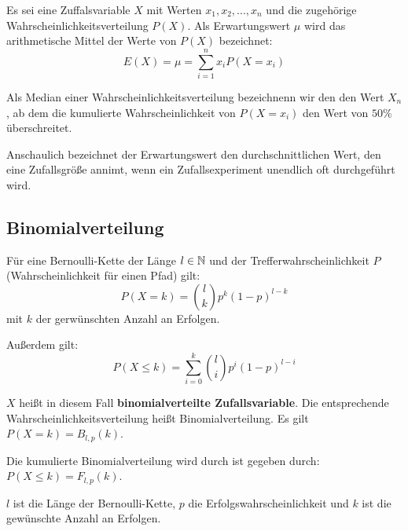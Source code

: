 \documentclass[main.tex]{subfiles}
\begin{document}
\begin{Definition}[Erwartungswert]
  Es sei eine Zuffalsvariable $X$ mit Werten $x_1,x_2,...,x_n$ und die zugehörige Wahrscheinlichkeitsverteilung $P(X)$. Als Erwartungswert $\mu$ wird das arithmetische Mittel der Werte von $P(X)$ bezeichnet:
  $$E(X)=\mu=\sum_{i=1}^{n}x_i P(X=x_i)$$
\end{Definition}

\begin{Definition}
  Als Median einer Wahrscheinlichkeitsverteilung bezeichnenn wir den den Wert $X_n$, ab dem die kumulierte Wahrscheinlichkeit von $P(X=x_i)$ den Wert von $50\%$ überschreitet.
\end{Definition}

\begin{Bemerkung}
  Anschaulich bezeichnet der Erwartungswert den durchschnittlichen Wert, den eine Zufallsgröße annimt, wenn ein Zufallsexperiment unendlich oft durchgeführt wird.
\end{Bemerkung}

\subsection{Binomialverteilung}
\begin{Theorem}
  Für eine Bernoulli-Kette der Länge $l \in \mathbb{N}$ und der Trefferwahrscheinlichkeit $P$ (Wahrscheinlichkeit für einen Pfad) gilt:
  $$P(X=k) = {l \choose k} p^k (1-p) ^{l-k}$$
  mit $k$ der gerwünschten Anzahl an Erfolgen.

  Außerdem gilt:
  $$P(X\leq k) = \sum_{i=0}^{k}{l \choose i} p^i (1-p) ^{l-i}$$
\end{Theorem}

\begin{Bemerkung}
  \begin{Definition}
    $X$ heißt in diesem Fall \textbf{binomialverteilte Zufallsvariable}. Die entsprechende Wahrscheinlichkeitsverteilung heißt Binomialverteilung. Es gilt $P(X=k) =  B_{l,p}(k)$.

    Die kumulierte Binomialverteilung wird durch ist gegeben durch: $P(X \leq k) = F_{l,p}(k)$.

    $l$ ist die Länge der Bernoulli-Kette, $p$ die Erfolgswahrscheinlichkeit und $k$ ist die gewünschte Anzahl an Erfolgen.

  \end{Definition}
\end{Bemerkung}
\end{document}

